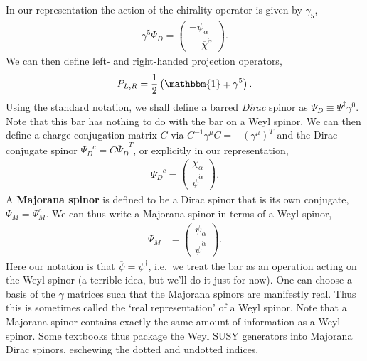 \documentclass[12pt, oneside]{report}    %
\begin{document}
In our representation the action of the chirality operator is given by $\gamma_5$,
\begin{align}
    \gamma^5\Psi_D = \begin{pmatrix}
        -\psi_\alpha\\\phantom{+}\overline\chi^{\dot\alpha}
    \end{pmatrix}.
\end{align} 
We can then define left- and right-handed projection operators,
\begin{align}
    P_{L,R} = \frac 12\left(\mathbbm{1}\mp\gamma^5\right).
\end{align}
Using the standard notation, we shall define a barred \textit{Dirac} spinor as $\overline\Psi_D \equiv \Psi^\dag\gamma^0$. Note that this bar has nothing to do with the bar on a Weyl spinor. We can then define a charge conjugation matrix $C$ via $C^{-1}\gamma^\mu C = -(\gamma^\mu)^T$ and the Dirac conjugate spinor $\Psi_D^{\phantom{D}c} = C\overline\Psi_D^{\phantom{D}T}$, or explicitly in our representation,
\begin{align}
    \Psi_D^{\phantom{D}c} = \begin{pmatrix}
        \chi_\alpha \\ \overline\psi^{\dot\alpha}
    \end{pmatrix}.
\end{align}
A \textbf{Majorana spinor} is defined to be a Dirac spinor that is its own conjugate, $\Psi_M = \Psi_M^c$. We can thus write a Majorana spinor in terms of a Weyl spinor,
\begin{align}
    \Psi_M &= \begin{pmatrix}
        \psi_\alpha \\ \overline\psi^{\dot\alpha}
    \end{pmatrix}.
\end{align}
Here our notation is that $\overline\psi = \psi^\dag$, i.e.\ we treat the bar as an operation acting on the Weyl spinor (a terrible idea, but we'll do it just for now).
One can choose a basis of the $\gamma$ matrices such that the Majorana spinors are manifestly real. Thus this is sometimes called the `real representation' of a Weyl spinor.%
%
Note that a Majorana spinor contains exactly the same amount of information as a Weyl spinor. Some textbooks thus package the Weyl SUSY generators into Majorana Dirac spinors, eschewing the dotted and undotted indices.
\end{document}
